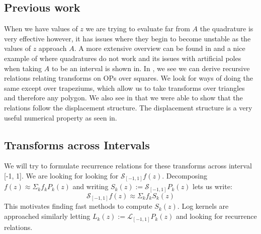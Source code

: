 \documentclass{article}
\begin{document}
\subsection{Previous work}
When we have values of $z$ we are trying to evaluate far from $A$ the quadrature is very effective however, it has issues where they begin to become unstable as the values of $z$ approach $A$.
A more extensive overview can be found in\cite{newtonianplanar} and a nice example of where quadratures do not work and its issues with artificial poles when taking $A$ to be an interval is shown in\cite{fastalgorithms}.
In \cite{logkernel}, we see we can derive recursive relations relating transforms on OPs over squares.
We look for ways of doing the same except over trapeziums, which allow us to take transforms over triangles and therefore any polygon.
We also see in \cite{logkernel} that we were able to show that the relations follow the displacement structure.
The displacement structure is a very useful numerical property as seen in\cite{displacement1,displacement2}.

\subsection{Transforms across Intervals}
We will try to formulate recurrence relations for these transforms across interval [-1, 1].
We are looking for looking for $\mathcal{S}_{[-1,1]}f(z)$.
Decomposing $f(z) \approx \Sigma_k f_kP_k(z)$ and writing $S_k(z):=\mathcal{S}_{[-1,1]}P_k(z)$ lets us write:
$$\mathcal{S}_{[-1,1]}f(z) \approx \Sigma_k f_kS_k(z)$$
This motivates finding fast methods to compute $S_k(z)$. Log kernels are approached similarly letting $L_k(z):=\mathcal{L}_{[-1,1]}P_k(z)$ and looking for recurrence relations.
\end{document}
